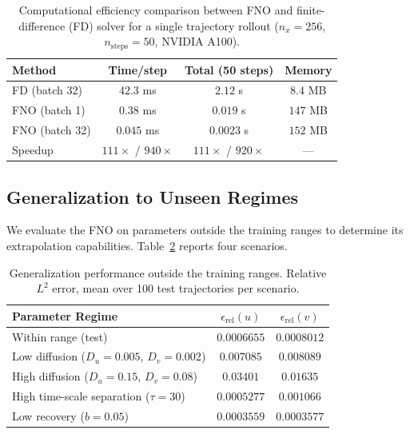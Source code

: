 \documentclass[runningheads]{llncs}
\begin{document}
\begin{table}[!ht]
\centering
\begin{small}
\setlength{\tabcolsep}{4pt}
\begin{tabular}{lccc}
\toprule
Method & Time/step & Total (50 steps) & Memory \\
\midrule
FD (batch 32) & $42.3$ ms & $2.12$ s & $8.4$ MB \\
FNO (batch 1) & $0.38$ ms & $0.019$ s & $147$ MB \\
FNO (batch 32) & $0.045$ ms & $0.0023$ s & $152$ MB \\
\midrule
Speedup & $111\times$ / $940\times$ & $111\times$ / $920\times$ & --- \\
\bottomrule
\end{tabular}
\end{small}
\smallskip
\caption{Computational efficiency comparison between FNO and finite-difference (FD) solver for a single trajectory rollout ($n_x = 256$, $n_{\text{steps}} = 50$, NVIDIA A100).}
\label{tab:efficiency_comparison}
\end{table}


\subsection{Generalization to Unseen Regimes}
\label{sec:extrapolation_results}
We evaluate the FNO on parameters outside the training ranges to determine its extrapolation capabilities. Table~\ref{tab:extrapolation} reports four scenarios.

\begin{table}[!htb]
\centering
\begin{sc}
\fontsize{8}{9.6}\selectfont
\setlength{\tabcolsep}{4pt}
\begin{tabular}{lcc}
\toprule
Parameter Regime & $\epsilon_{\text{rel}}(u)$ & $\epsilon_{\text{rel}}(v)$ \\
\midrule
Within range (test) & $0.0006655$ & $0.0008012$ \\
Low diffusion ($D_u{=}0.005$, $D_v{=}0.002$) & $0.007085$ & $0.008089$ \\
High diffusion ($D_u{=}0.15$, $D_v{=}0.08$) & $0.03401$ & $0.01635$ \\
High time-scale separation ($\tau{=}30$) & $0.0005277$ & $0.001066$ \\
Low recovery ($b{=}0.05$) & $0.0003559$ & $0.0003577$ \\
\bottomrule
\end{tabular}
\end{sc}
\smallskip
\caption{Generalization performance outside the training ranges. Relative $L^2$ error, mean over 100 test trajectories per scenario.}
\label{tab:extrapolation}
\end{table}
\end{document}

